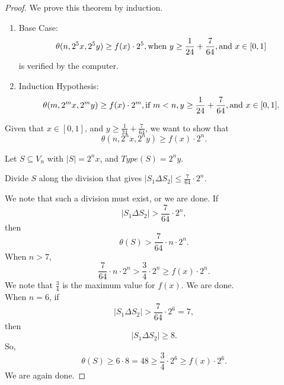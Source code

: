 \documentclass[12pt]{ucthesis}
\theoremstyle{plain}
\theoremstyle{definition}
\begin{document}
\begin{proof}
We prove this theorem by induction.
\begin{enumerate}[(1)]
\item Base Case:
	\begin{equation*}
	\theta(n, 2^5 x, 2^5 y) \ge f(x) \cdot 2^5,
	\textnormal{when } y \ge \frac{1}{24} + \frac{7}{64},
	\textnormal{and } x \in [0, 1]
	\end{equation*}
	is verified by the computer.
\item Induction Hypothesis:
	\begin{equation*}
	\theta(m, 2^m x, 2^m y) \ge f(x) \cdot 2^m,
	\textnormal{if } m < n, y \ge \frac{1}{24} + \frac{7}{64},
	\textnormal{and } x \in [0, 1].
	\end{equation*}
\end{enumerate}

Given that $x \in [0, 1]$, and $y \ge \frac{1}{24} + \frac{7}{64}$,
we want to show that
\begin{equation*}
\theta(n, 2^n x, 2^n y) \ge f(x) \cdot 2^n.
\end{equation*}

Let $S \subseteq V_n$ with $|S| = 2^n x$, and $Type(S) = 2^n y$.

Divide $S$ along the division that gives $|S_1 \Delta S_2| \le \frac{7}{64} \cdot 2^n$.

We note that such a division must exist, or we are done.
If
\begin{equation*}
|S_1 \Delta S_2| > \frac{7}{64} \cdot 2^n,
\end{equation*}
then
\begin{equation*}
\theta(S) > \frac{7}{64} \cdot n \cdot 2^n.
\end{equation*}
When $n > 7$,
\begin{equation*}
\frac{7}{64} \cdot n \cdot 2^n > \frac{3}{4} \cdot 2^n \ge f(x) \cdot 2^n.
\end{equation*}
We note that $\frac{3}{4}$ is the maximum value for $f(x)$.
We are done. \\
When $n = 6$, if
\begin{equation*}
|S_1 \Delta S_2| > \frac{7}{64} \cdot 2^6 = 7,
\end{equation*}
then
\begin{equation*}
|S_1 \Delta S_2| \ge 8.
\end{equation*}
So,
\begin{equation*}
\theta(S) \ge 6 \cdot 8 = 48 \ge \frac{3}{4} \cdot 2^6 \ge f(x) \cdot 2^6.
\end{equation*}
We are again done.


\end{proof}
\end{document}
